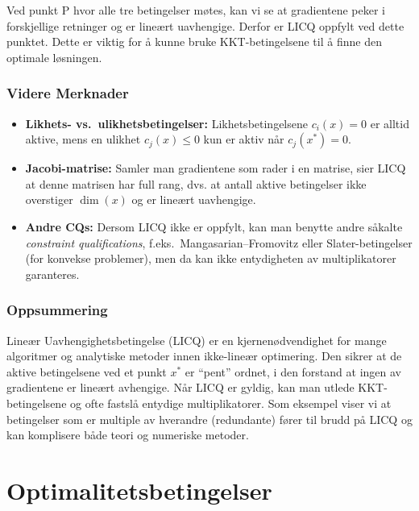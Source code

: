 Ved punkt P hvor alle tre betingelser møtes, kan vi se at gradientene peker i forskjellige retninger og er lineært uavhengige. Derfor er LICQ oppfylt ved dette punktet. Dette er viktig for å kunne bruke KKT-betingelsene til å finne den optimale løsningen.
\subsection{Videre Merknader}

\begin{itemize}
\item \textbf{Likhets- vs.\ ulikhetsbetingelser:} Likhetsbetingelsene \(c_i(x)=0\) er alltid aktive, mens en ulikhet \(c_j(x)\le 0\) kun er aktiv når \(c_j(x^*)=0\). 
\item \textbf{Jacobi-matrise:} Samler man gradientene som rader i en matrise, sier LICQ at denne matrisen har full rang, dvs. at antall aktive betingelser ikke overstiger \(\dim(x)\) og er lineært uavhengige.
\item \textbf{Andre CQs:} Dersom LICQ ikke er oppfylt, kan man benytte andre såkalte \emph{constraint qualifications}, f.eks.\ Mangasarian--Fromovitz eller Slater-betingelser (for konvekse problemer), men da kan ikke entydigheten av multiplikatorer garanteres.
\end{itemize}

\subsection{Oppsummering}

Lineær Uavhengighetsbetingelse (LICQ) er en kjernenødvendighet for mange algoritmer og analytiske metoder innen ikke-lineær optimering. Den sikrer at de aktive betingelsene ved et punkt \(x^*\) er ``pent'' ordnet, i den forstand at ingen av gradientene er lineært avhengige. Når LICQ er gyldig, kan man utlede KKT-betingelsene og ofte fastslå entydige multiplikatorer. Som eksempel viser vi at betingelser som er multiple av hverandre (redundante) fører til brudd på LICQ og kan komplisere både teori og numeriske metoder.

\chapter{Optimalitetsbetingelser}

